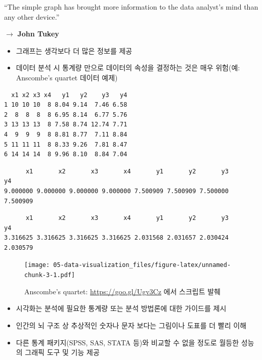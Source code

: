 \documentclass[
  11pt,
]{krantz}
\makeatletter
\providecommand{\tightlist}{%
  \setlength{\itemsep}{0pt}\setlength{\parskip}{0pt}}
\newenvironment{kframe}{%
\medskip{}
\setlength{\fboxsep}{.8em}
 \def\at@end@of@kframe{}%
 \ifinner\ifhmode%
  \def\at@end@of@kframe{\end{minipage}}%
  \begin{minipage}{\columnwidth}%
 \fi\fi%
 \def\FrameCommand##1{\hskip\@totalleftmargin \hskip-\fboxsep
 \colorbox{shadecolor}{##1}\hskip-\fboxsep
     \hskip-\linewidth \hskip-\@totalleftmargin \hskip\columnwidth}%
 \MakeFramed {\advance\hsize-\width
   \@totalleftmargin\z@ \linewidth\hsize
   \@setminipage}}%
 {\par\unskip\endMakeFramed%
 \at@end@of@kframe}
\renewenvironment{quote}{\begin{kframe}}{\end{kframe}}
\makeatother
\begin{document}
\normalsize

\begin{quote}
``The simple graph has brought more information to the data analyst's mind than any other device.''

\(\rightarrow\) \textbf{John Tukey}
\end{quote}

\begin{itemize}
\tightlist
\item
  그래프는 생각보다 더 많은 정보를 제공
\item
  데이터 분석 시 통계량 만으로 데이터의 속성을 결정하는 것은 매우 위험(예: Anscombe's quartet 데이터 예제)
\end{itemize}

\footnotesize

\begin{verbatim}
  x1 x2 x3 x4   y1   y2    y3   y4
1 10 10 10  8 8.04 9.14  7.46 6.58
2  8  8  8  8 6.95 8.14  6.77 5.76
3 13 13 13  8 7.58 8.74 12.74 7.71
4  9  9  9  8 8.81 8.77  7.11 8.84
5 11 11 11  8 8.33 9.26  7.81 8.47
6 14 14 14  8 9.96 8.10  8.84 7.04
\end{verbatim}

\begin{verbatim}
      x1       x2       x3       x4       y1       y2       y3       y4 
9.000000 9.000000 9.000000 9.000000 7.500909 7.500909 7.500000 7.500909 
\end{verbatim}

\begin{verbatim}
      x1       x2       x3       x4       y1       y2       y3       y4 
3.316625 3.316625 3.316625 3.316625 2.031568 2.031657 2.030424 2.030579 
\end{verbatim}

\begin{figure}
\centering
\texttt{[image: 05-data-visualization\_files/figure-latex/unnamed-chunk-3-1.pdf]}
\caption{\label{fig:unnamed-chunk-3}Anscombe's quartet: \url{https://goo.gl/Ugv3Cz} 에서 스크립트 발췌}
\end{figure}

\normalsize

\begin{itemize}
\tightlist
\item
  시각화는 분석에 필요한 통계량 또는 분석 방법론에 대한 가이드를 제시
\item
  인간의 뇌 구조 상 추상적인 숫자나 문자 보다는 그림이나 도표를 더 빨리 이해
\item
  다른 통계 패키지(SPSS, SAS, STATA 등)와 비교할 수 없을 정도로 월등한 성능의 그래픽 도구 및 기능 제공
\end{itemize}
\end{document}
